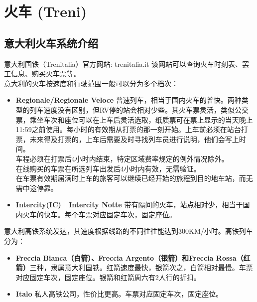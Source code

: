 \section{火车 (Treni)}

\subsection{意大利火车系统介绍}

意大利国铁（Trenitalia）官方网站: trenitalia.it 该网站可以查询火车时刻表、罢工信息、购买火车票等。\\
意大利的火车按速度和行驶范围一般可以分为多个档次：
\begin{itemize}
\item  \textbf{Regionale/Regionale Veloce} 普速列车，相当于国内火车的普快。两种类型的列车速度没有区别，但RV停的站会相对少些。其火车票灵活，类似公交票，乘坐车次和座位可以在上车后灵活选取，纸质票可在票上显示的当天晚上11:59之前使用。每小时的有效期从打票的那一刻开始。上车前必须在站台打票，未来得及打票的，上车后需要及时寻找列车员进行说明，他们会写上时间。\\
车程必须在打票后4小时内结束，特定区域费率规定的例外情况除外。\\
在线购买的车票在所选列车出发后4小时内有效，无需验证。\\
在车票有效期届满时上车的旅客可以继续已经开始的旅程到目的地车站，而无需中途停靠。
\item  \textbf{Intercity(IC) | Intercity Notte} 带有隔间的火车，站点相对少，相当于国内火车的快车。每个车票对应固定车次，固定座位。
\end{itemize}

意大利高铁系统发达，其速度根据线路的不同往往能达到300KM/小时。高铁列车分为：
\begin{itemize}
\item  \textbf{Freccia Bianca（白箭）、Freccia Argento（银箭）和Freccia Rossa（红箭）}三种，隶属意大利国铁。红箭速度最快，银箭次之，白箭相对最慢。车票对应固定车次，固定座位。银箭和红箭周六有2人行的折扣。
\item  \textbf{Italo} 私人高铁公司，性价比更高。车票对应固定车次，固定座位。
\end{itemize}

